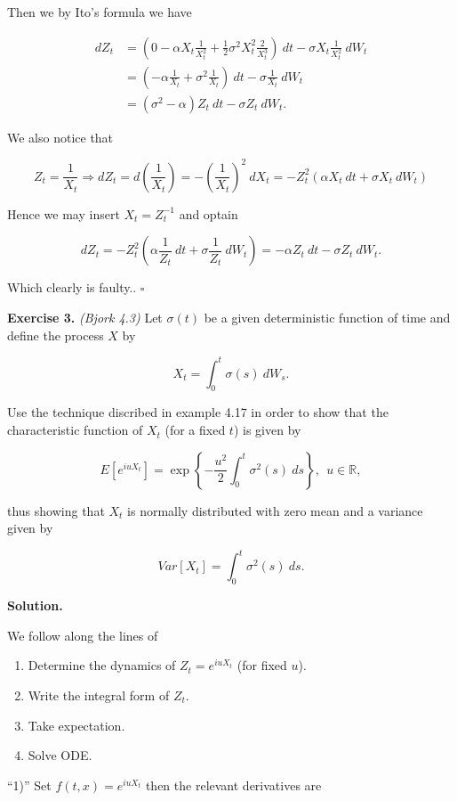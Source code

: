 \documentclass[
]{article}
\providecommand{\tightlist}{%
  \setlength{\itemsep}{0pt}\setlength{\parskip}{0pt}}
\begin{document}
Then we by Ito's formula we have

\begin{align*}
dZ_t&=\left(0-\alpha X_t\frac{1}{X_t^2}+\frac{1}{2} \sigma^2 X_t^2\frac{2}{X_t^3}\right)\ dt-\sigma X_t\frac{1}{X_t^2}\ dW_t\\
&=\left(-\alpha \frac{1}{X_t}+ \sigma^2 \frac{1}{X_t}\right)\ dt-\sigma \frac{1}{X_t}\ dW_t\\
&=(\sigma^2-\alpha)Z_t\ dt-\sigma Z_t\ dW_t.
\end{align*}

We also notice that

\[
Z_t=\frac{1}{X_t}\Rightarrow dZ_t=d\left(\frac{1}{X_t}\right)=-\left(\frac{1}{X_t}\right)^2\ dX_t=-Z_t^2(\alpha X_t\ dt+\sigma X_t\ dW_t)
\]

Hence we may insert \(X_t=Z_t^{-1}\) and optain

\[
dZ_t=-Z_t^2\left(\alpha\frac{1}{Z_t}\ dt + \sigma \frac{1}{Z_t}\ dW_t\right)=-\alpha Z_t\ dt-\sigma Z_t\ dW_t.
\]

Which clearly is faulty.. \(\square\)

\textbf{Exercise 3.} \emph{(Bjork 4.3)} Let \(\sigma(t)\) be a given
deterministic function of time and define the process \(X\) by

\[
X_t=\int_0^t\sigma(s)\ dW_s.
\]

Use the technique discribed in example 4.17 in order to show that the
characteristic function of \(X_t\) (for a fixed \(t\)) is given by

\[
E[e^{iuX_t}]=\exp\left\{-\frac{u^2}{2}\int_0^t\sigma^2(s)\ ds\right\},\ \ u\in\mathbb{R},
\]

thus showing that \(X_t\) is normally distributed with zero mean and a
variance given by

\[
Var[X_t]=\int_0^t\sigma^2(s)\ ds.
\]

\textbf{Solution.}

We follow along the lines of

\begin{enumerate}
\def\labelenumi{\arabic{enumi}.}
\tightlist
\item
  Determine the dynamics of \(Z_t=e^{iuX_t}\) (for fixed \(u\)).
\item
  Write the integral form of \(Z_t\).
\item
  Take expectation.
\item
  Solve ODE.
\end{enumerate}

``1)'' Set \(f(t,x)=e^{iuX_t}\) then the relevant derivatives are
\end{document}
